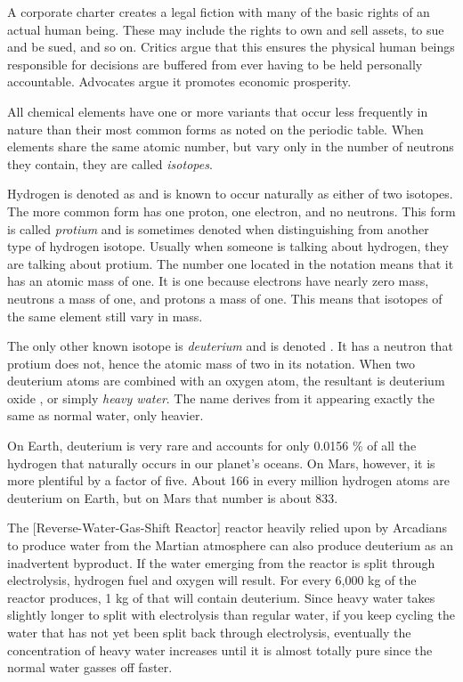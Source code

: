 A corporate charter creates a legal fiction with many of the basic rights of an actual human being. These may include the rights to own and sell assets, to sue and be sued, and so on. Critics argue that this ensures the physical human beings responsible for decisions are buffered from ever having to be held personally accountable. Advocates argue it promotes economic prosperity.
\stopdefinition

All chemical elements have one or more variants that occur less frequently in nature than their most common forms as noted on the periodic table. When elements share the same atomic number, but vary only in the number of neutrons they contain, they are called {\it isotopes}.

Hydrogen is denoted as  and is known to occur naturally as either of two isotopes. The more common form has one proton, one electron, and no neutrons. This form is called {\it protium} and is sometimes denoted  when distinguishing from another type of hydrogen isotope. Usually when someone is talking about hydrogen, they are talking about protium. The number one located in the notation means that it has an atomic mass of one. It is one because electrons have nearly zero mass, neutrons a mass of one, and protons a mass of one. This means that isotopes of the same element still vary in mass.

The only other known isotope is {\it deuterium} and is denoted . It has a neutron that protium does not, hence the atomic mass of two in its notation. When two deuterium atoms are combined with an oxygen atom, the resultant is deuterium oxide , or simply {\it heavy water}. The name derives from it appearing exactly the same as normal water, only heavier.

On Earth, deuterium is very rare and accounts for only 0.0156 \% of all the hydrogen that naturally occurs in our planet's oceans. On Mars, however, it is more plentiful by a factor of five. About 166 in every million hydrogen atoms are deuterium on Earth, but on Mars that number is about 833. 

The [Reverse-Water-Gas-Shift Reactor] reactor heavily relied upon by Arcadians to produce water from the Martian atmosphere can also produce deuterium as an inadvertent byproduct. If the water emerging from the reactor is split through electrolysis, hydrogen fuel and oxygen will result. For every 6,000 kg of  the reactor produces, 1 kg of that will contain deuterium. Since heavy water takes slightly longer to split with electrolysis than regular water, if you keep cycling the water that has not yet been split back through electrolysis, eventually the concentration of heavy water increases until it is almost totally pure since the normal water gasses off faster.

